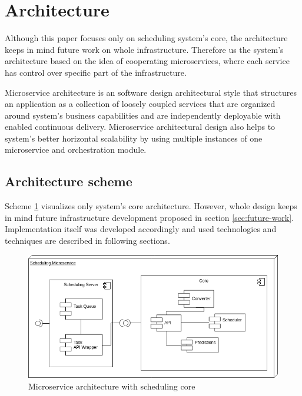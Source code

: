 \section{Architecture}\label{sec:architecture}

Although this paper focuses only on scheduling system's core,
the architecture keeps in mind future work on whole infrastructure.
Therefore us the system's architecture based on the idea of cooperating microservices,
where each service has control over specific part of the infrastructure. 

Microservice architecture is an software design architectural style 
that structures an application as a collection of loosely coupled services that 
are organized around system's business capabilities\cite{namiot2014micro} 
and are independently deployable with enabled continuous delivery\cite{balalaie2016microservices}.
Microservice architectural design also helps to system's better horizontal scalability
by using multiple instances of one microservice 
and orchestration module.


\subsection{Architecture scheme}\label{subsec:architecture-scheme}
Scheme \ref{fig:scheduling-core-arch} visualizes only system's core architecture. 
However,
whole design keeps in mind future infrastructure development proposed in section \ref{sec:future-work}.
Implementation itself was developed accordingly 
and used technologies and techniques are described in following sections.

\begin{figure}[ht]
    \includegraphics[width=\textwidth]{i_scheduler.png} 
    \centering
    \caption{Microservice architecture with scheduling core}
    \label{fig:scheduling-core-arch}
\end{figure}

